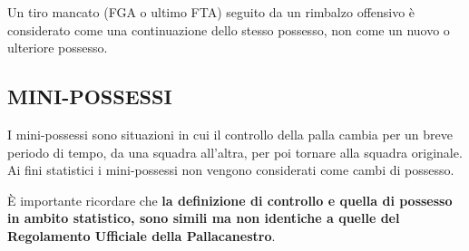 Un tiro mancato (FGA o ultimo FTA) seguito da un rimbalzo offensivo è considerato come una continuazione dello stesso possesso, non come un nuovo o ulteriore possesso. 

\subsection{MINI-POSSESSI}
\subsectionline

I mini-possessi sono situazioni in cui il controllo della palla cambia per un breve periodo di tempo, da una squadra all'altra, per poi tornare alla squadra originale. Ai fini statistici i mini-possessi non vengono considerati come cambi di possesso.

È importante ricordare che \textbf{la definizione di controllo e quella di possesso in ambito statistico, sono simili ma non identiche a quelle del Regolamento Ufficiale della Pallacanestro}.